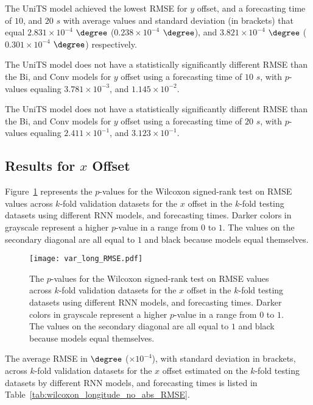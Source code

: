 The UniTS model achieved the lowest RMSE for $y$ offset, and a forecasting time of $10$, and $20$ $s$ with average values and standard deviation (in brackets) that equal $2.831 \times 10^{-4}$ $\degree$ ($0.238 \times 10^{-4}$ $\degree$), and $3.821 \times 10^{-4}$ $\degree$ ($0.301 \times 10^{-4}$ $\degree$) respectively.

The UniTS model does not have a statistically significantly different RMSE than the Bi, and Conv models for $y$ offset using a forecasting time of $10$ $s$, with $p$-values equaling $3.781 \times 10^{-3}$, and $1.145 \times 10^{-2}$.

The UniTS model does not have a statistically significantly different RMSE than the Bi, and Conv models for $y$ offset using a forecasting time of $20$ $s$, with $p$-values equaling $2.411 \times 10^{-1}$, and $3.123 \times 10^{-1}$.

\subsection{Results for $x$ Offset}

Figure~\ref{fig:var_long_RMSE} represents the $p$-values for the Wilcoxon signed-rank test on RMSE values across $k$-fold validation datasets for the $x$ offset in the $k$-fold testing datasets using different RNN models, and forecasting times. Darker colors in grayscale represent a higher $p$-value in a range from $0$ to $1$. The values on the secondary diagonal are all equal to $1$ and black because models equal themselves.

\begin{figure}[!ht]
	\centering
	\texttt{[image: var\_long\_RMSE.pdf]}
	\caption{The $p$-values for the Wilcoxon signed-rank test on RMSE values across $k$-fold validation datasets for the $x$ offset in the $k$-fold testing datasets using different RNN models, and forecasting times. Darker colors in grayscale represent a higher $p$-value in a range from $0$ to $1$. The values on the secondary diagonal are all equal to $1$ and black because models equal themselves.}
	\label{fig:var_long_RMSE}
\end{figure}

The average RMSE in $\degree$ ($\times 10^{-4}$), with standard deviation in brackets, across $k$-fold validation datasets for the $x$ offset estimated on the $k$-fold testing datasets by different RNN models, and forecasting times is listed in Table~\ref{tab:wilcoxon_longitude_no_abs_RMSE}.

